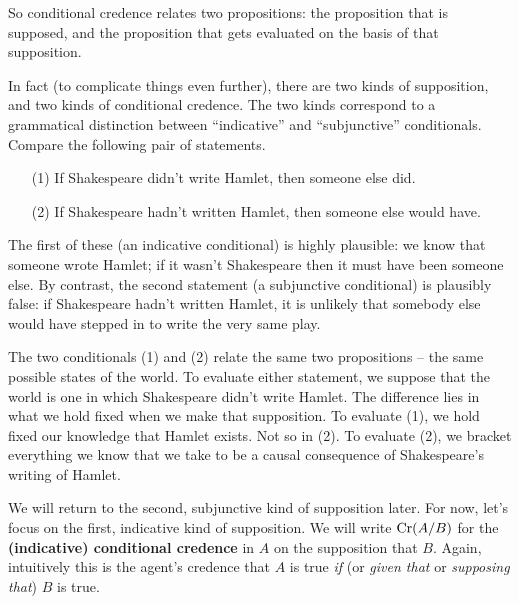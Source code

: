 So conditional credence relates two propositions: the proposition that
is supposed, and the proposition that gets evaluated on the basis of
that supposition.

In fact (to complicate things even further), there are two kinds of
supposition, and two kinds of conditional credence. The two kinds
correspond to a grammatical distinction between ``indicative'' and
``subjunctive'' conditionals. Compare the following pair of
statements.
%
\begin{itemize}
\item[(1)] If Shakespeare didn't write Hamlet, then someone else did.
\item[(2)] If Shakespeare hadn't written Hamlet, then someone else
  would have.
\end{itemize}
%
The first of these (an indicative conditional) is highly plausible: we
know that someone wrote Hamlet; if it wasn't Shakespeare then it must
have been someone else. By contrast, the second statement (a
subjunctive conditional) is plausibly false: if Shakespeare hadn't
written Hamlet, it is unlikely that somebody else would have stepped
in to write the very same play.

The two conditionals (1) and (2) relate the same two propositions -- the
same possible states of the world. To evaluate either statement, we
suppose that the world is one in which Shakespeare didn't write
Hamlet. The difference lies in what we hold fixed when we make that
supposition. To evaluate (1), we hold fixed our knowledge that Hamlet
exists. Not so in (2). To evaluate (2), we bracket everything we know
that we take to be a causal consequence of Shakespeare's writing of
Hamlet.


We will return to the second, subjunctive kind of supposition later.
For now, let's focus on the first, indicative kind of supposition.  We
will write $\text{Cr}(A/B)$ for the \textbf{(indicative) conditional
  credence} in $A$ on the supposition that $B$. Again, intuitively
this is the agent's credence that $A$ is true \emph{if} (or
\emph{given that} or \emph{supposing that}) $B$ is true.

